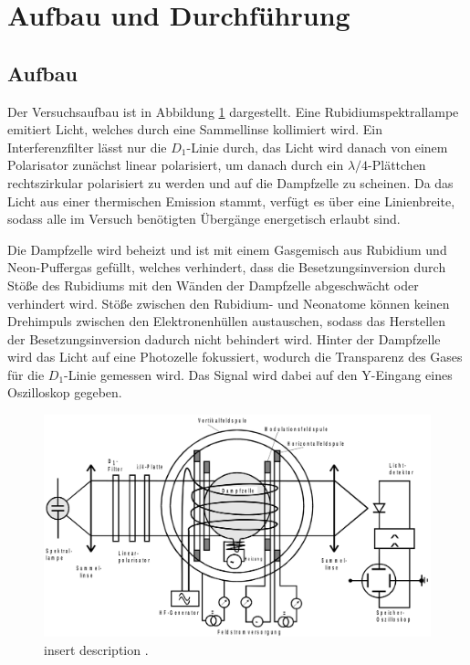 \section{Aufbau und Durchführung}
\label{sec:Durchführung}

  \subsection{Aufbau}

  Der Versuchsaufbau ist in Abbildung \ref{fig:aufbau} dargestellt.
  Eine Rubidiumspektrallampe emitiert Licht, welches durch eine Sammellinse kollimiert wird.
  Ein Interferenzfilter lässt nur die $D_1$-Linie durch, das Licht wird danach von einem Polarisator zunächst linear polarisiert, um danach durch ein $\lambda/4$-Plättchen rechtszirkular polarisiert zu werden und auf die Dampfzelle zu scheinen. Da das Licht aus einer thermischen Emission stammt, verfügt es über eine Linienbreite, sodass alle im Versuch benötigten Übergänge energetisch erlaubt sind.

  Die Dampfzelle wird beheizt und ist mit einem Gasgemisch aus Rubidium und Neon-Puffergas gefüllt, welches verhindert, dass die Besetzungsinversion durch Stöße des Rubidiums mit den Wänden der Dampfzelle abgeschwächt oder verhindert wird. Stöße zwischen den Rubidium- und Neonatome können keinen Drehimpuls zwischen den Elektronenhüllen austauschen, sodass das Herstellen der Besetzungsinversion dadurch nicht behindert wird. Hinter der Dampfzelle wird das Licht auf eine Photozelle fokussiert, wodurch die Transparenz des Gases für die $D_1$-Linie gemessen wird. Das Signal wird dabei auf den Y-Eingang eines Oszilloskop gegeben.

  \begin{figure}
    \centering
    \includegraphics[width=\textwidth]{pictures/aufbau.png}
    \caption{insert description \cite{Versuchsanleitung}.}
    \label{fig:aufbau}
  \end{figure}

